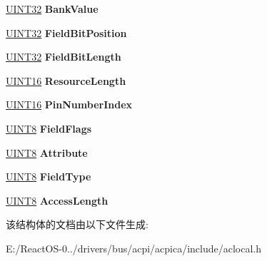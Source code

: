\begin{DoxyCompactItemize}
\item 
\mbox{\label{structacpi__create__field__info_a601adea5eecbf2ef530828f12be84b92}} 
\hyperlink{_processor_bind_8h_ae1e6edbbc26d6fbc71a90190d0266018}{U\+I\+N\+T32} {\bfseries Bank\+Value}
\item 
\mbox{\label{structacpi__create__field__info_a33fac50e18e7ea6674fdfee09de5dba5}} 
\hyperlink{_processor_bind_8h_ae1e6edbbc26d6fbc71a90190d0266018}{U\+I\+N\+T32} {\bfseries Field\+Bit\+Position}
\item 
\mbox{\label{structacpi__create__field__info_a8690f127e6fb1941f5b2077cb1cd129f}} 
\hyperlink{_processor_bind_8h_ae1e6edbbc26d6fbc71a90190d0266018}{U\+I\+N\+T32} {\bfseries Field\+Bit\+Length}
\item 
\mbox{\label{structacpi__create__field__info_af4b214020e9d08b165ba07a497edbf99}} 
\hyperlink{_processor_bind_8h_a09f1a1fb2293e33483cc8d44aefb1eb1}{U\+I\+N\+T16} {\bfseries Resource\+Length}
\item 
\mbox{\label{structacpi__create__field__info_a0f4686a0c75a7b45864f45b05566062d}} 
\hyperlink{_processor_bind_8h_a09f1a1fb2293e33483cc8d44aefb1eb1}{U\+I\+N\+T16} {\bfseries Pin\+Number\+Index}
\item 
\mbox{\label{structacpi__create__field__info_a0572788957b8fb14e5938ac67394f0b2}} 
\hyperlink{_processor_bind_8h_ab27e9918b538ce9d8ca692479b375b6a}{U\+I\+N\+T8} {\bfseries Field\+Flags}
\item 
\mbox{\label{structacpi__create__field__info_ab5a9af206c88262e1c284e108ec3cacc}} 
\hyperlink{_processor_bind_8h_ab27e9918b538ce9d8ca692479b375b6a}{U\+I\+N\+T8} {\bfseries Attribute}
\item 
\mbox{\label{structacpi__create__field__info_afd7a5a8f4db9132e75d1e895c3c82bec}} 
\hyperlink{_processor_bind_8h_ab27e9918b538ce9d8ca692479b375b6a}{U\+I\+N\+T8} {\bfseries Field\+Type}
\item 
\mbox{\label{structacpi__create__field__info_a541a3bb38643cdb35520898ea4f0834e}} 
\hyperlink{_processor_bind_8h_ab27e9918b538ce9d8ca692479b375b6a}{U\+I\+N\+T8} {\bfseries Access\+Length}
\end{DoxyCompactItemize}


该结构体的文档由以下文件生成\+:\begin{DoxyCompactItemize}
\item 
E\+:/\+React\+O\+S-\/0../drivers/bus/acpi/acpica/include/aclocal.\+h\end{DoxyCompactItemize}
